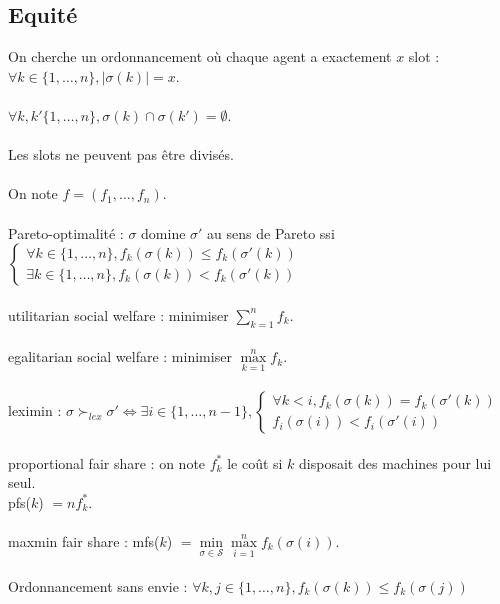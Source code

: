 \documentclass[12pt]{article}
\theoremstyle{definition}
\begin{document}
\newpage

\subsection{Equité}\label{equite}

\noindent
On cherche un ordonnancement où chaque agent a exactement $x$ slot : $\forall k \in \lbrace 1, \dots , n \rbrace, |\sigma(k)| = x$.\\\\
$\forall k, k' \lbrace 1, \dots , n \rbrace, \sigma(k)\cap\sigma(k') = \emptyset$.\\\\
Les slots ne peuvent pas être divisés.\\\\
On note $f = (f_1, \dots, f_n)$.\\\\
Pareto-optimalité : $\sigma$ domine $\sigma'$ au sens de Pareto ssi \\
$\left\{
\begin{array}{l}
  \forall k \in \lbrace1, \dots,n\rbrace,f_k(\sigma(k))\leq f_k(\sigma'(k)) \\
  \exists k \in \lbrace1, \dots,n\rbrace,f_k(\sigma(k))< f_k(\sigma'(k))
\end{array}
\right.$\\\\
utilitarian social welfare : minimiser $\sum\limits_{k = 1}^n f_k$.\\\\
egalitarian social welfare : minimiser $\max\limits_{k = 1}^n f_k$.\\\\
leximin : $\sigma \succ_{lex}\sigma' \iff \exists i\in \lbrace1, \dots,n-1\rbrace,
\left\{
\begin{array}{l}
  \forall k < i ,f_k(\sigma(k)) = f_k(\sigma'(k))\\
  f_i(\sigma(i)) < f_i(\sigma'(i))
\end{array}
\right.$\\\\
proportional fair share : on note $f_k^*$ le coût si $k$ disposait des machines pour lui seul.\\ pfs($k$) $ = nf_k^*$.\\\\
maxmin fair share : mfs($k$) $= \min\limits_{\sigma\in\mathscr{S}}\max\limits_{i=1}^n f_k(\sigma(i))$.\\\\
Ordonnancement sans envie : $\forall k,j\in \lbrace1, \dots,n\rbrace, f_k(\sigma(k))\leq f_k(\sigma(j))$\\\\
\end{document}
